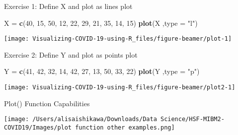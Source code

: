\documentclass[
  ignorenonframetext,
]{beamer}
\newenvironment{Shaded}{\begin{snugshade}}{\end{snugshade}}
\newcommand{\DataTypeTok}[1]{\textcolor[rgb]{0.13,0.29,0.53}{#1}}
\newcommand{\DecValTok}[1]{\textcolor[rgb]{0.00,0.00,0.81}{#1}}
\newcommand{\KeywordTok}[1]{\textcolor[rgb]{0.13,0.29,0.53}{\textbf{#1}}}
\newcommand{\NormalTok}[1]{#1}
\newcommand{\StringTok}[1]{\textcolor[rgb]{0.31,0.60,0.02}{#1}}
\begin{document}
\begin{frame}[fragile]{Exercise 1: Define X and plot as lines plot}
\protect\hypertarget{exercise-1-define-x-and-plot-as-lines-plot}{}

\begin{Shaded}
\begin{Highlighting}[]
\NormalTok{X =}\StringTok{ }\KeywordTok{c}\NormalTok{(}\DecValTok{40}\NormalTok{, }\DecValTok{15}\NormalTok{, }\DecValTok{50}\NormalTok{, }\DecValTok{12}\NormalTok{, }\DecValTok{22}\NormalTok{, }\DecValTok{29}\NormalTok{, }\DecValTok{21}\NormalTok{, }\DecValTok{35}\NormalTok{, }\DecValTok{14}\NormalTok{, }\DecValTok{15}\NormalTok{)}
\KeywordTok{plot}\NormalTok{(X ,}\DataTypeTok{type =} \StringTok{"l"}\NormalTok{)}
\end{Highlighting}
\end{Shaded}

\texttt{[image: Visualizing-COVID-19-using-R\_files/figure-beamer/plot-1]}

\end{frame}

\begin{frame}[fragile]{Exercise 2: Define Y and plot as points plot}
\protect\hypertarget{exercise-2-define-y-and-plot-as-points-plot}{}

\begin{Shaded}
\begin{Highlighting}[]
\NormalTok{Y =}\StringTok{ }\KeywordTok{c}\NormalTok{(}\DecValTok{41}\NormalTok{, }\DecValTok{42}\NormalTok{, }\DecValTok{32}\NormalTok{, }\DecValTok{14}\NormalTok{, }\DecValTok{42}\NormalTok{, }\DecValTok{27}\NormalTok{, }\DecValTok{13}\NormalTok{, }\DecValTok{50}\NormalTok{, }\DecValTok{33}\NormalTok{, }\DecValTok{22}\NormalTok{)}
\KeywordTok{plot}\NormalTok{(Y ,}\DataTypeTok{type =} \StringTok{"p"}\NormalTok{)}
\end{Highlighting}
\end{Shaded}

\texttt{[image: Visualizing-COVID-19-using-R\_files/figure-beamer/plot2-1]}

\end{frame}

\begin{frame}{Plot() Function Capabilities}
\protect\hypertarget{plot-function-capabilities}{}

\texttt{[image: /Users/alisaishikawa/Downloads/Data Science/HSF-MIBM2-COVID19/Images/plot function other examples.png]}

\end{frame}
\end{document}
